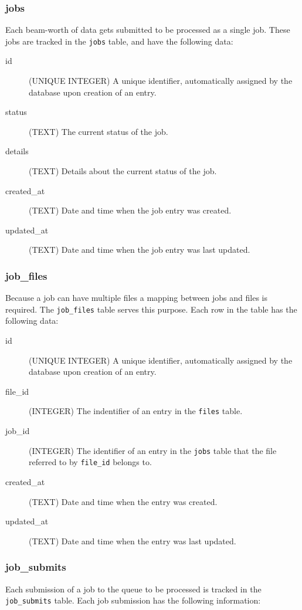\documentclass[12pt]{article}
\begin{document}
\subsubsection{jobs}
Each beam-worth of data gets submitted to be processed as a single job. These jobs are tracked in the \texttt{jobs} table, and have the following data:

\begin{description}
    \item[id] (UNIQUE INTEGER)  A unique identifier, automatically assigned by the database upon creation of an entry.
    \item[status] (TEXT) The current status of the job.
    \item[details] (TEXT) Details about the current status of the job.
    \item[created\_at] (TEXT) Date and time when the job entry was created.
    \item[updated\_at] (TEXT) Date and time when the job entry was last updated.
\end{description}

\subsubsection{job\_files}
Because a job can have multiple files a mapping between jobs and files is required. The \texttt{job\_files} table serves this purpose. Each row in the table has the following data:

\begin{description}
    \item[id] (UNIQUE INTEGER)  A unique identifier, automatically assigned by the database upon creation of an entry.
    \item[file\_id] (INTEGER) The indentifier of an entry in the \texttt{files} table.
    \item[job\_id] (INTEGER) The identifier of an entry in the \texttt{jobs} table that the file referred to by \texttt{file\_id} belongs to.
    \item[created\_at] (TEXT) Date and time when the entry was created.
    \item[updated\_at] (TEXT) Date and time when the entry was last updated.
\end{description}

\subsubsection{job\_submits}
Each submission of a job to the queue to be processed is tracked in the \texttt{job\_submits} table. Each job submission has the following information:
\end{document}
